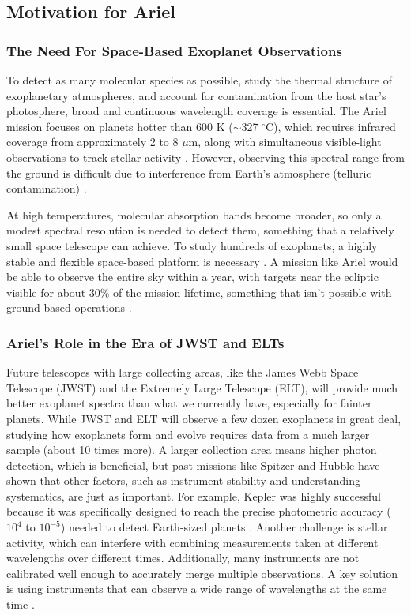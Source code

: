 \documentclass[12pt]{article}
\begin{document}
\subsection{Motivation for Ariel}

\subsubsection{The Need For Space-Based Exoplanet Observations}

To detect as many molecular species as possible, study the thermal structure of exoplanetary atmospheres, and account for contamination from the host star's photosphere, broad and continuous wavelength coverage is essential.
The Ariel mission focuses on planets hotter than 600 K ($\sim$327 $^{\circ}$C), which requires infrared coverage from approximately 2 to 8 $\mu$m, along with simultaneous visible-light observations to track stellar activity \cite{ARIEL_M4_Proposal}.
However, observing this spectral range from the ground is difficult due to interference from Earth's atmosphere (telluric contamination) \cite{ARIEL_M4_Proposal}.

At high temperatures, molecular absorption bands become broader, so only a modest spectral resolution is needed to detect them, something that a relatively small space telescope can achieve.
To study hundreds of exoplanets, a highly stable and flexible space-based platform is necessary \cite{ARIEL_M4_Proposal}. A mission like Ariel would be able to observe the entire sky within a year, with targets near the ecliptic visible for about 30\%
of the mission lifetime, something that isn't possible with ground-based operations \cite{ARIEL_M4_Proposal}.

\subsubsection{Ariel's Role in the Era of JWST and ELTs}

Future telescopes with large collecting areas, like the James Webb Space Telescope (JWST) and the Extremely Large Telescope (ELT), will provide much better exoplanet spectra than what we currently have, especially for fainter planets. While JWST and ELT will observe a few dozen exoplanets in great deal,
studying how exoplanets form and evolve requires data from a much larger sample (about 10 times more). A larger collection area means higher photon detection, which is beneficial, but past missions like Spitzer and Hubble have shown that other factors, such as instrument stability and understanding systematics, are just as important.
For example, Kepler was highly successful because it was specifically designed to reach the precise photometric accuracy ($10^{4}$ to $10^{-5}$) needed to detect Earth-sized planets \cite{kondo2001kepler}. 
Another challenge is stellar activity, which can interfere with combining measurements taken at different wavelengths over different times. Additionally, many instruments are not calibrated well enough to accurately merge multiple observations. A key solution is using instruments that can observe a wide range of wavelengths at the same time \cite{ARIEL_M4_Proposal}.
\end{document}
